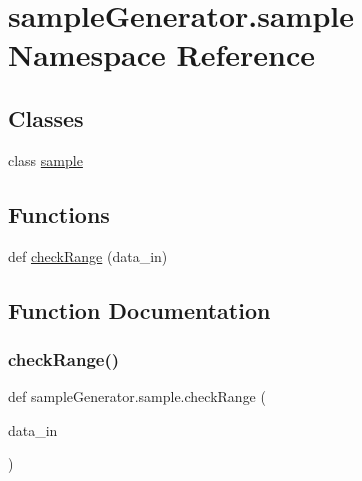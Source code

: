 \hypertarget{namespacesample_generator_1_1sample}{}\section{sample\+Generator.\+sample Namespace Reference}
\label{namespacesample_generator_1_1sample}
\subsection*{Classes}
\begin{DoxyCompactItemize}
\item 
class \hyperlink{classsample_generator_1_1sample_1_1sample}{sample}
\end{DoxyCompactItemize}
\subsection*{Functions}
\begin{DoxyCompactItemize}
\item 
def \hyperlink{namespacesample_generator_1_1sample_a0b9ff0e06d76ca8c0aeb429aa9e87f68}{check\+Range} (data\+\_\+in)
\end{DoxyCompactItemize}


\subsection{Function Documentation}
\mbox{\label{namespacesample_generator_1_1sample_a0b9ff0e06d76ca8c0aeb429aa9e87f68}} 
\subsubsection{\texorpdfstring{check\+Range()}{checkRange()}}
{\footnotesize\ttfamily def sample\+Generator.\+sample.\+check\+Range (\begin{DoxyParamCaption}\item[{}]{data\+\_\+in }\end{DoxyParamCaption})}

